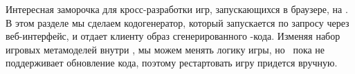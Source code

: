 \secdown

Интересная заморочка для кросс-разработки игр, запускающихся в браузере, на
\hico. В этом разделе мы сделаем кодогенератор, который запускается по
запросу через веб-интерфейс, и отдает клиенту образ сгенерированного \wasm-кода.
Изменяя набор игровых метамоделей внутри \hico, мы можем менять логику игры, но
\wasm\ пока не поддерживает обновление кода, поэтому рестартовать игру придется
вручную.




\secup